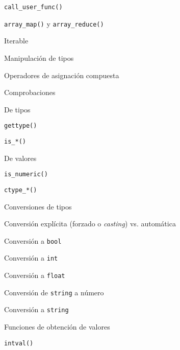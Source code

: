 \begin{longenum}
\begin{longenum}
\begin{longenum}
            \begin{longenum}
                \item \texttt{call\_user\_func()}
                \item \texttt{array\_map()} y \texttt{array\_reduce()}
            \end{longenum}
            \item Iterable
        \end{longenum}
        \item Manipulación de tipos
        \begin{longenum}
            \item Operadores de asignación compuesta
            \item Comprobaciones
            \begin{longenum}
                \item De tipos
                \begin{longenum}
                    \item \texttt{gettype()}
                    \item \texttt{is\_*()}
                \end{longenum}
                \item De valores
                \begin{longenum}
                    \item \texttt{is\_numeric()}
                    \item \texttt{ctype\_*()}
                \end{longenum}
            \end{longenum}
            \item Conversiones de tipos
            \begin{longenum}
                \item Conversión explícita (forzado o \textit{casting}) vs. automática
                \item Conversión a \texttt{bool}
                \item Conversión a \texttt{int}
                \item Conversión a \texttt{float}
                \item Conversión de \texttt{string} a número
                \item Conversión a \texttt{string}
                \item Funciones de obtención de valores
                \begin{longenum}
                    \item \texttt{intval()}

\end{longenum}
\end{longenum}
\end{longenum}
\end{longenum}
\end{longenum}
